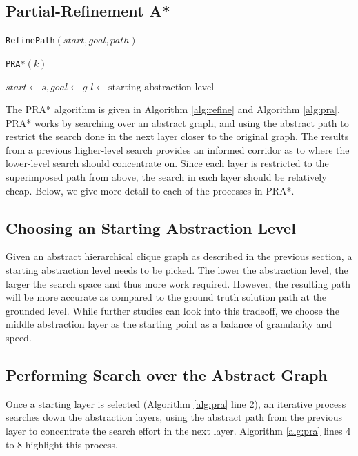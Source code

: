 \documentclass[letterpaper]{article} %
\begin{document}
\subsection{Partial-Refinement A*}

\begin{algorithm}[t]
\caption{\texttt{RefinePath}$(start, goal, path)$}
\label{alg:refine}
\DontPrintSemicolon
{}\;
\end{algorithm}

\begin{algorithm}[ht]
\caption{\texttt{PRA*}$(k)$}
\label{alg:pra}
\DontPrintSemicolon
{}

$start \gets s, goal \gets g$\;
$l \gets \text{starting abstraction level}$\;
\end{algorithm}

The PRA* algorithm is given in Algorithm \ref{alg:refine} and Algorithm \ref{alg:pra}.
PRA* works by searching over an abstract graph,
and using the abstract path to restrict the search done in the next layer closer to the original graph.
The results from a previous higher-level search provides an informed corridor as to where the lower-level search should concentrate on.
Since each layer is restricted to the superimposed path from above, the search in each layer should be relatively cheap.
Below, we give more detail to each of the processes in PRA*.

\subsection*{Choosing an Starting Abstraction Level}
Given an abstract hierarchical clique graph as described in the previous section,
a starting abstraction level needs to be picked. 
The lower the abstraction level, the larger the search space and thus more work required.
However, the resulting path will be more accurate as compared to the ground truth solution path at the grounded level.
While further studies can look into this tradeoff, we choose the middle abstraction layer as the starting point 
as a balance of granularity and speed.

\subsection*{Performing Search over the Abstract Graph}
Once a starting layer is selected (Algorithm \ref{alg:pra} line 2),
an iterative process searches down the abstraction layers, 
using the abstract path from the previous layer to concentrate the search effort in the next layer.
Algorithm \ref{alg:pra} lines 4 to 8 highlight this process.
\end{document}
